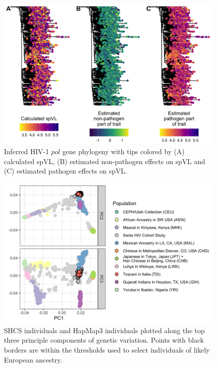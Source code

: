 \documentclass[]{article}
\begin{document}
\begin{doublespace}
\begin{figure}[H]
\begin{center}
\includegraphics[width = \linewidth]{figures/spvl_on_tree.png}
	\caption{Inferred HIV-1 $pol$ gene phylogeny with tips colored by (A) calculated spVL, (B) estimated non-pathogen effects on spVL and (C) estimated pathogen effects on spVL.}
	\label{fig:spvl-on-tree}
	\end{center}
\end{figure}

\begin{figure}[H]
	\includegraphics[width=\linewidth]{figures/host_genotype_pca.png}
	\caption{SHCS individuals and HapMap3 individuals plotted along the top three principle components of genetic variation. Points with black borders are within the thresholds used to select individuals of likely European ancestry.}
	\label{fig:PCA}
\end{figure}


\end{doublespace}
\end{document}
